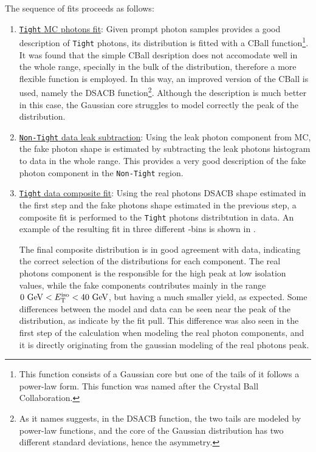 The sequence of fits proceeds as follows:
\begin{enumerate}
    \item \underline{\texttt{Tight} \ac{MC} photons fit}: Given prompt photon samples provides a good description of \texttt{Tight} photons, its \etiso distribution is fitted with a \ac{CBall} function\footnote{This function consists of a Gaussian core but one of the tails of it follows a power-law form. This function was named after the Crystal Ball Collaboration.}. It was found that the simple \ac{CBall} desription does not accomodate well in the whole range, specially in the bulk of the \etiso distribution, therefore a more flexible function is employed. In this way, an improved version of the \ac{CBall} is used, namely the \ac{DSACB} function\footnote{As it names suggests, in the \ac{DSACB} function, the two tails are modeled by power-law functions, and the core of the Gaussian distribution has two different standard deviations, hence the asymmetry.}. Although the description is much better in this case, the Gaussian core struggles to model correctly the peak of the distribution.
    \item \underline{\texttt{Non-Tight} data leak subtraction}: Using the leak photon component from \ac{MC}, the fake photon shape is estimated by subtracting the leak photons histogram to data in the whole \etiso range. This provides a very good description of the fake photon component in the \texttt{Non-Tight} region.
    \item \underline{\texttt{Tight} data composite fit}: Using the real photons \ac{DSACB} shape estimated in the first step and the fake photons shape estimated in the previous step, a composite fit is performed to the \texttt{Tight} photons \etiso distribtution in data. An example of the resulting fit in three different \pt-bins is shown in \Fig{\ref{fig:bkg:estimation:fits_tightID_data}}.

        The final composite distribution is in good agreement with data, indicating the correct selection of the distributions for each component. The real photons component is the responsible for the high peak at low isolation values, while the fake components contributes mainly in the range \(0~\text{GeV} < E_{\text{T}}^{\text{iso}} < 40 ~\text{GeV}\), but having a much smaller yield, as expected. Some differences between the model and data can be seen near the peak of the distribution, as indicate by the fit pull. This difference was also seen in the first step of the calculation when modeling the real photon components, and it is directly originating from the gaussian modeling of the real photons peak.


\end{enumerate}
